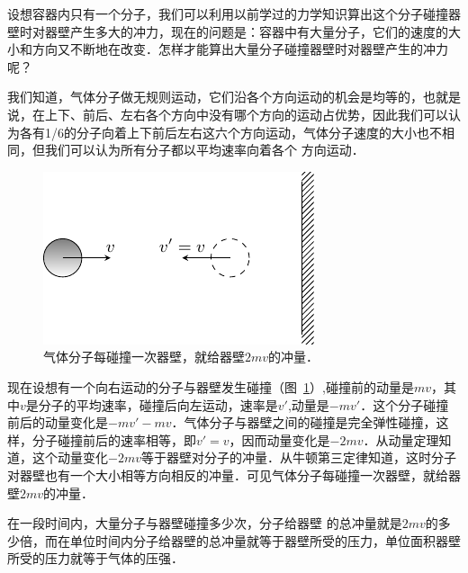 设想容器内只有一个分子，我们可以利用以前学过的力学知识算出这个分子碰撞器壁时对器壁产生多大的冲力，现在的问题是：容器中有大量分子，它们的速度的大小和方向又不断地在改变．怎样才能算出大量分子碰撞器壁时对器壁产生的冲力呢？

我们知道，气体分子做无规则运动，它们沿各个方向运动的机会是均等的，也就是说，在上下、前后、左右各个方向中没有哪个方向的运动占优势，因此我们可以认为各有1/6的分子向着上下前后左右这六个方向运动，气体分子速度的大小也不相同，但我们可以认为所有分子都以平均速率向着各个
方向运动．

\begin{figure}[htbp]
    \centering
    \includegraphics{fig/B/3-14.pdf}
    \caption{气体分子每碰撞一次器壁，就给器壁$2mv$的冲量．}\label{fig_B_3-14}
\end{figure}



现在设想有一个向右运动的分子与器壁发生碰撞（图~\ref{fig_B_3-14}）,碰撞前的动量是$mv$，其中$v$是分子的平均速率，碰撞后向左运动，速率是$v'$,动量是$-mv'$．这个分子碰撞前后的动量变化是$-mv'-mv$．气体分子与器壁之间的碰撞是完全弹性碰撞，这样，分子碰撞前后的速率相等，即$v'=v$，因而动量变化是$-2mv$．从动量定理知道，这个动量变化$-2mv$等于器壁对分子的冲量．从牛顿第三定律知道，这时分子对器壁也有一个大小相等方向相反的冲量．可见气体分子每碰撞一次器壁，就给器壁$2mv$的冲量．

在一段时间内，大量分子与器壁碰撞多少次，分子给器壁
的总冲量就是$2mv$的多少倍，而在单位时间内分子给器壁的总冲量就等于器壁所受的压力，单位面积器壁所受的压力就等于气体的压强．

